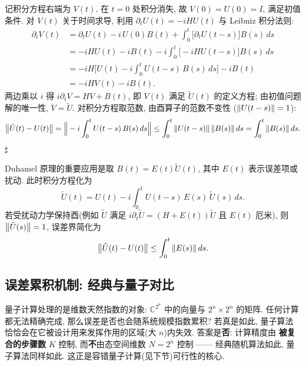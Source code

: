 \documentclass[utf8]{article} %
\numberwithin{equation}{section}   %
\newtheorem{Note}{\hskip 2em {\color{red} 注}}[subsection]
\newenvironment{Proof}{{\noindent\it Proof:}\quad}{\hfill $\sharp $\par}
\begin{document}
\begin{Proof}
    记积分方程右端为 $V(t)$. 在 $t = 0$ 处积分消失, 故 $V(0) = U(0) = I$, 满足初值条件.
    对 $V(t)$ 关于时间求导, 利用 $\partial_t U(t) = -iHU(t)$ 与 Leibniz 积分法则:
    \begin{align*}
        \partial_t V(t) &= \partial_t U(t) - i\, U(0)B(t) + \int_0^t \big[\partial_t U(t-s)\big] B(s)\, ds \\
        &= -iHU(t) - iB(t) - i \int_0^t \big[-iHU(t-s)\big] B(s)\, ds \\
        &= -iH\Big[U(t) - i \int_0^t U(t-s)\, B(s)\, ds\Big] - iB(t) \\
        &= -iH V(t) - iB(t).
    \end{align*}
    两边乘以 $i$ 得 $i\partial_t V = HV + B(t)$, 即 $V(t)$ 满足 $\tilde U(t)$ 的定义方程;
    由初值问题解的唯一性, $V = \tilde U$. 对积分方程取范数, 由酉算子的范数不变性
    ($\norm{U(t-s)} = 1$):
    \[
        \norm{\tilde U(t) - U(t)} = \Big\| -i \int_0^t U(t-s)\, B(s)\, ds \Big\|
        \le \int_0^t \norm{U(t-s)}\, \norm{B(s)}\, ds
        = \int_0^t \norm{B(s)}\, ds.
    \]
\end{Proof}

\begin{Note}[误差项形式 $B(t) = E(t)\tilde U(t)$]
    Duhamel 原理的重要应用是取 $B(t) = E(t)\tilde U(t)$, 其中 $E(t)$ 表示误差项或扰动.
    此时积分方程化为
    \[
        \tilde U(t) = U(t) - i \int_0^t U(t-s)\, E(s)\, \tilde U(s)\, ds.
    \]
    若受扰动力学保持酉(例如 $\tilde U$ 满足 $i\partial_t \tilde U = (H + E(t))\tilde U$ 且 $E(t)$ 厄米),
    则 $\norm{\tilde U(s)} = 1$, 误差界简化为
    \[
        \norm{\tilde U(t) - U(t)} \le \int_0^t \norm{E(s)}\, ds.
    \]
\end{Note}

\subsection{误差累积机制: 经典与量子对比}

\begin{Note}[误差不随态空间维数爆炸]
    量子计算处理的是维数天然指数的对象: $\mathbb{C}^{2^n}$ 中的向量与 $2^n \times 2^n$ 的矩阵.
    任何计算都无法精确完成, 那么误差是否也会随系统规模指数累积? 若真是如此, 量子算法
    恰恰会在它被设计用来发挥作用的区域(大 $n$)内失效. 答案是\textbf{否}: 计算精度由
    \textbf{被复合的步骤数} $K$ 控制, 而\textbf{不}由态空间维数 $N = 2^n$ 控制 ——
    经典随机算法如此, 量子算法同样如此. 这正是容错量子计算(见下节)可行性的核心.
\end{Note}
\end{document}
